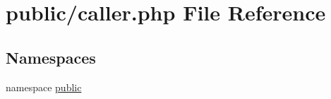\hypertarget{caller_8php}{
\section{public/caller.php File Reference}
\label{caller_8php}
}
\subsection*{Namespaces}
\begin{CompactItemize}
\item 
namespace \hyperlink{namespacepublic}{public}
\end{CompactItemize}
